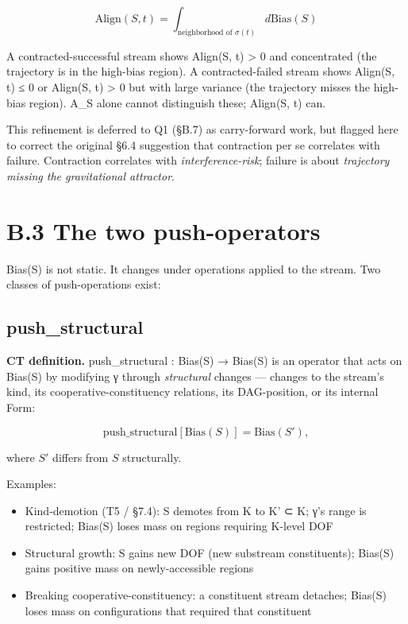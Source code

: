 \documentclass[11pt, openany]{book}
\newcommand{\sectionbreak}{\clearpage}
\begin{document}
$$\text{Align}(S, t) = \int_{\text{neighborhood of } \sigma(t)} d\text{Bias}(S)$$

A contracted-successful stream shows Align(S, t) > 0 and concentrated (the trajectory is in the high-bias region). A contracted-failed stream shows Align(S, t) ≤ 0 or Align(S, t) > 0 but with large variance (the trajectory misses the high-bias region). A\_\allowbreak{}S alone cannot distinguish these; Align(S, t) can.

This refinement is deferred to Q1 (§B.7) as carry-forward work, but flagged here to correct the original §6.4 suggestion that contraction per se correlates with failure. Contraction correlates with \textit{interference-risk}; failure is about \textit{trajectory missing the gravitational attractor}.

\sectionbreak

\section{B.3 The two push-operators}

Bias(S) is not static. It changes under operations applied to the stream. Two classes of push-operations exist:

\subsection{push\_\allowbreak{}structural}

\textbf{CT definition.} push\_\allowbreak{}structural : Bias(S) → Bias(S) is an operator that acts on Bias(S) by modifying γ through \textit{structural} changes --- changes to the stream's kind, its cooperative-constituency relations, its DAG-position, or its internal Form:

$$\text{push\_structural}[\text{Bias}(S)] = \text{Bias}(S'),$$

where $S'$ differs from $S$ structurally.

Examples:
\begin{itemize}
\item Kind-demotion (T5 / §7.4): S demotes from K to K' ⊂ K; γ's range is restricted; Bias(S) loses mass on regions requiring K-level DOF
\item Structural growth: S gains new DOF (new substream constituents); Bias(S) gains positive mass on newly-accessible regions
\item Breaking cooperative-constituency: a constituent stream detaches; Bias(S) loses mass on configurations that required that constituent
\end{itemize}
\end{document}
